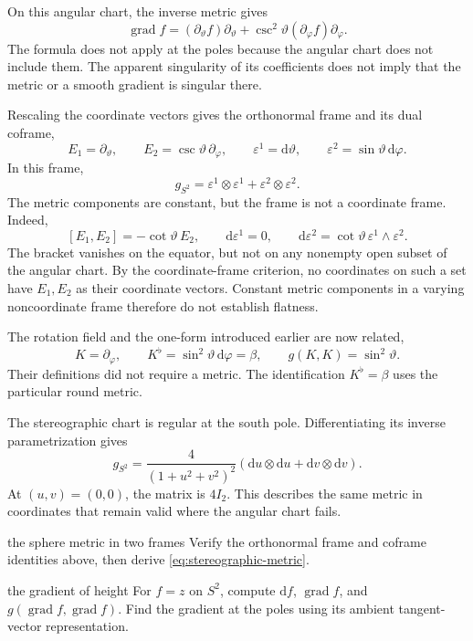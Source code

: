 \documentclass[11pt,a4paper]{article}
\numberwithin{equation}{section}
\newcommand{\dd}{\mathrm d}
\newcommand{\grad}{\operatorname{grad}}
\begin{document}
On this angular chart, the inverse metric gives
\[
 \grad f=(\partial_\vartheta f)\partial_\vartheta
          +\csc^2\vartheta(\partial_\varphi f)\partial_\varphi.
\]
The formula does not apply at the poles because the angular chart does
not include them. The apparent singularity of its coefficients does
not imply that the metric or a smooth gradient is singular there.

Rescaling the coordinate vectors gives the orthonormal frame and its
dual coframe,
\[
 E_1=\partial_\vartheta,\qquad
 E_2=\csc\vartheta\,\partial_\varphi,
 \qquad
 \varepsilon^1=\dd\vartheta,\qquad
 \varepsilon^2=\sin\vartheta\,\dd\varphi.
\]
In this frame,
\[
 g_{S^2}=\varepsilon^1\otimes\varepsilon^1+\varepsilon^2\otimes\varepsilon^2.
\]
The metric components are constant, but the frame is not a coordinate
frame. Indeed,
\[
 [E_1,E_2]=-\cot\vartheta\,E_2,\qquad
 \dd\varepsilon^1=0,\qquad
 \dd\varepsilon^2=\cot\vartheta\,\varepsilon^1\wedge\varepsilon^2.
\]
The bracket vanishes on the equator, but not on any nonempty open
subset of the angular chart. By the coordinate-frame criterion, no
coordinates on such a set have \(E_1,E_2\) as their coordinate vectors.
Constant metric components in a varying noncoordinate frame therefore
do not establish flatness.

The rotation field and the one-form introduced earlier are now related,
\[
 K=\partial_\varphi,\qquad K^\flat=\sin^2\vartheta\,\dd\varphi=\beta,
 \qquad g(K,K)=\sin^2\vartheta.
\]
Their definitions did not require a metric. The identification
\(K^\flat=\beta\) uses the particular round metric.

The stereographic chart is regular at the south pole. Differentiating
its inverse parametrization gives
\begin{equation}
 g_{S^2}=\frac{4}{(1+u^2+v^2)^2}
           (\dd u\otimes\dd u+\dd v\otimes\dd v).
 \label{eq:stereographic-metric}
\end{equation}
At \((u,v)=(0,0)\), the matrix is \(4I_2\). This describes the same
metric in coordinates that remain valid where the angular chart fails.


\begin{studentwork}[3.2cm]{the sphere metric in two frames}
Verify the orthonormal frame and coframe identities above, then
derive \eqref{eq:stereographic-metric}.
\end{studentwork}

\begin{studentwork}[3.3cm]{the gradient of height}
For \(f=z\) on \(S^2\), compute \(\dd f\), \(\grad f\), and
\(g(\grad f,\grad f)\). Find the gradient at the poles using
its ambient tangent-vector representation.
\end{studentwork}
\end{document}
